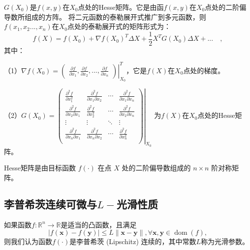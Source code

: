   $G(X_0)$是$f(x,y)$在$X_0$点处的Hesse矩阵。它是由函$f(x,y)$在$X_0$点处的二阶偏导数所组成的方阵。
将二元函数的泰勒展开式推广到多元函数，则$f(x_1,x_2...,x_n)$在$X_0$点处的泰勒展开式的矩阵形式为：
\begin{equation}
    f(X) = f(X_0) + \nabla f(X_0)^T\Delta X + \frac{1}{2}X^TG(X_0)\Delta X + ...\quad,
\end{equation}
其中：

（1）$\nabla f(X_0) =
    \left.
    \begin{pmatrix}
        \displaystyle\frac{\partial f}{\partial x_1},
        \displaystyle\frac{\partial f}{\partial x_2},
        ...,
        \displaystyle\frac{\partial f}{\partial x_n} 
    \end{pmatrix}\right|_{X_0}^T$，它是$f(X)$在$X_0$点处的梯度。
        
（2）$ G(X_0) = 
        \left.
        \begin{pmatrix}
            \displaystyle\frac{\partial^2f}{\partial x_1^2} & \displaystyle\frac{\partial^2f}{\partial x_1\partial x_2} & \cdots & \displaystyle\frac{\partial^2f}{\partial x_1\partial x_n}\\
            \displaystyle\frac{\partial^2f}{\partial x_2\partial x_1} & \displaystyle\frac{\partial^2f}{\partial x_2^2} & \cdots & \displaystyle\frac{\partial^2f}{\partial x_2\partial x_n}\\
            \vdots & \vdots & \ddots & \vdots\\
            \displaystyle\frac{\partial^2f}{\partial x_n\partial x_1} & \displaystyle\frac{\partial^2f}{\partial x_n\partial x_2} & \cdots & \displaystyle\frac{\partial^2f}{\partial x_n^2}\\
        \end{pmatrix}
        \right|_{X_0}$
        为$f(X)$在$X_0$点处的Hesse矩阵。
\begin{definition}[Hesse矩阵]
    Hesse矩阵是由目标函数 $f(\cdot)$ 在点 $X$ 处的二阶偏导数组成的 $n\times n$ 阶对称矩阵。       
\end{definition}

\subsection{李普希茨连续可微与$L-$光滑性质}
\begin{definition}[李普希茨连续]
    如果函数$f: \mathbb{R}^{n} \rightarrow \mathbb{R}$是适当的凸函数，且满足
\begin{equation}
    |f(\bm{x})-f(\bm{y})| \leq L\|\bm{x}-\bm{y}\|, \forall \bm{x}, \bm{y} \in \operatorname{dom}(f),
    \nonumber
\end{equation}
则我们认为函数$f(\cdot)$是李普希茨 (Lipschitz) 连续的，其中常数$L$称为光滑参数。
\end{definition}


